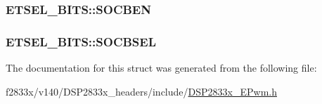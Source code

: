\subsubsection[{S\+O\+C\+B\+E\+N}]{ E\+T\+S\+E\+L\+\_\+\+B\+I\+T\+S\+::\+S\+O\+C\+B\+E\+N}\label{struct_e_t_s_e_l___b_i_t_s_ad5afc2b9ad38f8b1f95c67f9597406c1}
\hypertarget{struct_e_t_s_e_l___b_i_t_s_a6616efc33d6cefacf585954ecdf35202}{}
\subsubsection[{S\+O\+C\+B\+S\+E\+L}]{ E\+T\+S\+E\+L\+\_\+\+B\+I\+T\+S\+::\+S\+O\+C\+B\+S\+E\+L}\label{struct_e_t_s_e_l___b_i_t_s_a6616efc33d6cefacf585954ecdf35202}


The documentation for this struct was generated from the following file\+:\begin{DoxyCompactItemize}
\item 
f2833x/v140/\+D\+S\+P2833x\+\_\+headers/include/\hyperlink{_d_s_p2833x___e_pwm_8h}{D\+S\+P2833x\+\_\+\+E\+Pwm.\+h}\end{DoxyCompactItemize}
